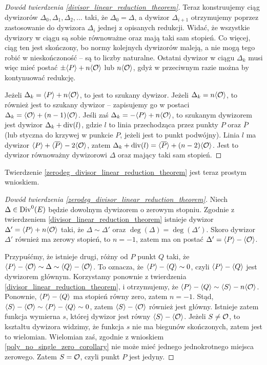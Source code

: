 \begin{proof}[Dowód twierdzenia \ref{divisor_linear_reduction_theorem}]
Teraz konstruujemy ciąg dywizorów
$\Delta_0, \Delta_1, \Delta_2, \ldots$ taki,
że $\Delta_0 = \Delta$,
a dywizor $\Delta_{i+1}$ otrzymujemy
poprzez zastosowanie do dywizora $\Delta_i$ jednej z opisanych redukcji.
Widać, że wszystkie dywizory w ciągu są sobie równoważne
oraz mają taki sam stopień.
Co więcej, ciąg ten jest skończony,
bo normy kolejnych dywizorów maleją,
a nie mogą tego robić w nieskończoność -- są to liczby naturalne.
Ostatni dywizor w ciągu $\Delta_k$ musi więc mieć postać
$\pm\langle P\rangle + n\langle\mathcal{O}\rangle$ lub $n\langle\mathcal{O}\rangle$,
gdyż w przeciwnym razie można by kontynuować redukcję.

Jeżeli $\Delta_k = \langle P\rangle + n\langle\mathcal{O}\rangle$,
to jest to szukany dywizor.
Jeżeli $\Delta_k = n\langle\mathcal{O}\rangle$,
to również jest to szukany dywizor --
zapisujemy go w postaci $\Delta_k = \langle\mathcal{O}\rangle + (n-1)\langle\mathcal{O}\rangle$.
Jeśli zaś $\Delta_k = -\langle P\rangle + n\langle\mathcal{O}\rangle$,
to szukanym dywizorem jest dywizor
$\Delta_k + \operatorname{div}(l)$,
gdzie $l$ to linia przechodząca przez punkty $P$ oraz $\overline{P}$
(lub styczna do krzywej w punkcie $P$, jeżeli jest to punkt podwójny).
Linia $l$ ma dywizor $\langle P\rangle + \langle\overline{P}\rangle - 2\langle\mathcal{O}\rangle$,
zatem $\Delta_k + \operatorname{div}(l) = \langle\overline{P}\rangle + (n-2)\langle\mathcal{O}\rangle$.
Jest to dywizor równoważny dywizorowi $\Delta$ oraz mający taki sam stopień.
\end{proof}

Twierdzenie \ref{zerodeg_divisor_linear_reduction_theorem}
jest teraz prostym wnioskiem.

\begin{proof}[Dowód twierdzenia \ref{zerodeg_divisor_linear_reduction_theorem}]
Niech $\Delta \in \operatorname{Div}^0(E)$ będzie dowolnym dywizorem o zerowym stopniu.
Zgodnie z twierdzeniem \ref{divisor_linear_reduction_theorem}
istnieje dywizor $\Delta' = \langle P\rangle + n\langle\mathcal{O}\rangle$
taki, że $\Delta \sim \Delta'$ oraz $\deg(\Delta) = \deg(\Delta')$.
Skoro dywizor $\Delta'$ również ma zerowy stopień,
to $n = -1$, zatem ma on postać $\Delta' = \langle P\rangle - \langle\mathcal{O}\rangle$.

Przypuśćmy, że istnieje drugi, różny od $P$ punkt $Q$ taki,
że $\langle P\rangle - \langle\mathcal{O}\rangle \sim \Delta \sim \langle Q\rangle - \langle\mathcal{O}\rangle$.
To oznacza, że $\langle P\rangle - \langle Q\rangle \sim 0$,
czyli $\langle P\rangle - \langle Q\rangle$ jest dywizorem głównym.
Korzystamy ponownie z twierdzenia \ref{divisor_linear_reduction_theorem},
i otrzymujemy, że $\langle P\rangle - \langle Q\rangle \sim \langle S\rangle - n\langle\mathcal{O}\rangle$.
Ponownie, $\langle P\rangle - \langle Q\rangle$ ma stopień równy zero,
zatem $n = -1$.
Stąd, $\langle S\rangle - \langle\mathcal{O}\rangle \sim \langle P\rangle - \langle Q\rangle \sim 0$,
zatem $\langle S\rangle - \langle\mathcal{O}\rangle$ również jest główny.
Istnieje zatem funkcja wymierna $s$,
której dywizor jest równy $\langle S\rangle - \langle\mathcal{O}\rangle$.
Jeżeli $S \neq \mathcal{O}$,
to kształtu dywizora widzimy, że funkcja $s$ nie ma biegunów skończonych,
zatem jest to wielomian.
Wielomian zaś, zgodnie z wnioskiem \ref{poly_no_single_zero_corollary}
nie może mieć jednego jednokrotnego miejsca zerowego.
Zatem $S = \mathcal{O}$, czyli punkt $P$ jest jedyny.
\end{proof}


